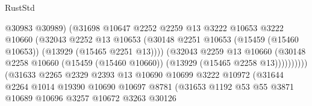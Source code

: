 \begin{lexlean}{RustStd}
\begin{coremodule}
                                          @30983
                                          @30989)
                                        (@31698
                                          @10647
                                          @2252
                                          @2259
                                          @13
                                          @3222
                                          @10653
                                          @3222
                                          @10660
                                          (@32043
                                            @2252
                                            @13
                                            @10653
                                            (@30148
                                              @2251
                                              @10653
                                              (@15459 (@15460 @10653))
                                              (@13929 (@15465 @2251 @13))))
                                          (@32043
                                            @2259
                                            @13
                                            @10660
                                            (@30148
                                              @2258
                                              @10660
                                              (@15459 (@15460 @10660))
                                              (@13929 (@15465 @2258 @13))))))))))
                              (@31633
                                @2265
                                @2329
                                @2393
                                @13
                                @10690
                                @10699
                                @3222
                                @10972
                                (@31644
                                  @2264
                                  @1014
                                  @19390
                                  @10690
                                  @10697
                                  @8781
                                  (@31653
                                    @1192
                                    @53
                                    @55
                                    @3871
                                    @10689
                                    @10696
                                    @3257
                                    @10672
                                    @3263
                                    @30126

\end{coremodule}
\end{lexlean}

